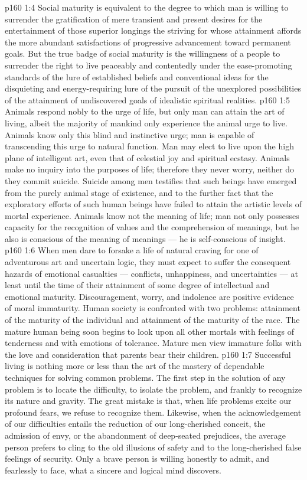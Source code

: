 \vs p160 1:4 Social maturity is equivalent to the degree to which man is willing to surrender the gratification of mere transient and present desires for the entertainment of those superior longings the striving for whose attainment affords the more abundant satisfactions of progressive advancement toward permanent goals. But the true badge of social maturity is the willingness of a people to surrender the right to live peaceably and contentedly under the ease\hyp{}promoting standards of the lure of established beliefs and conventional ideas for the disquieting and energy\hyp{}requiring lure of the pursuit of the unexplored possibilities of the attainment of undiscovered goals of idealistic spiritual realities.
\vs p160 1:5 Animals respond nobly to the urge of life, but only man can attain the art of living, albeit the majority of mankind only experience the animal urge to live. Animals know only this blind and instinctive urge; man is capable of transcending this urge to natural function. Man may elect to live upon the high plane of intelligent art, even that of celestial joy and spiritual ecstasy. Animals make no inquiry into the purposes of life; therefore they never worry, neither do they commit suicide. Suicide among men testifies that such beings have emerged from the purely animal stage of existence, and to the further fact that the exploratory efforts of such human beings have failed to attain the artistic levels of mortal experience. Animals know not the meaning of life; man not only possesses capacity for the recognition of values and the comprehension of meanings, but he also is conscious of the meaning of meanings --- he is self\hyp{}conscious of insight.
\vs p160 1:6 When men dare to forsake a life of natural craving for one of adventurous art and uncertain logic, they must expect to suffer the consequent hazards of emotional casualties --- conflicts, unhappiness, and uncertainties --- at least until the time of their attainment of some degree of intellectual and emotional maturity. Discouragement, worry, and indolence are positive evidence of moral immaturity. Human society is confronted with two problems: attainment of the maturity of the individual and attainment of the maturity of the race. The mature human being soon begins to look upon all other mortals with feelings of tenderness and with emotions of tolerance. Mature men view immature folks with the love and consideration that parents bear their children.
\vs p160 1:7 Successful living is nothing more or less than the art of the mastery of dependable techniques for solving common problems. The first step in the solution of any problem is to locate the difficulty, to isolate the problem, and frankly to recognize its nature and gravity. The great mistake is that, when life problems excite our profound fears, we refuse to recognize them. Likewise, when the acknowledgement of our difficulties entails the reduction of our long\hyp{}cherished conceit, the admission of envy, or the abandonment of deep\hyp{}seated prejudices, the average person prefers to cling to the old illusions of safety and to the long\hyp{}cherished false feelings of security. Only a brave person is willing honestly to admit, and fearlessly to face, what a sincere and logical mind discovers.
